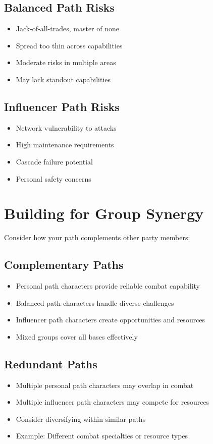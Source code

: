 \subsection*{Balanced Path Risks}
\begin{itemize}
\item Jack-of-all-trades, master of none
\item Spread too thin across capabilities
\item Moderate risks in multiple areas
\item May lack standout capabilities
\end{itemize}

\subsection*{Influencer Path Risks}
\begin{itemize}
\item Network vulnerability to attacks
\item High maintenance requirements
\item Cascade failure potential
\item Personal safety concerns
\end{itemize}

\section{Building for Group Synergy}

Consider how your path complements other party members:

\subsection*{Complementary Paths}
\begin{itemize}
\item Personal path characters provide reliable combat capability
\item Balanced path characters handle diverse challenges
\item Influencer path characters create opportunities and resources
\item Mixed groups cover all bases effectively
\end{itemize}

\subsection*{Redundant Paths}
\begin{itemize}
\item Multiple personal path characters may overlap in combat
\item Multiple influencer path characters may compete for resources
\item Consider diversifying within similar paths
\item Example: Different combat specialties or resource types
\end{itemize}

